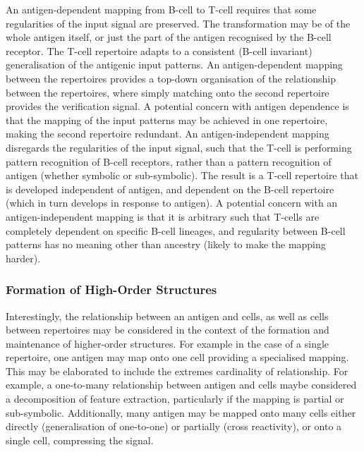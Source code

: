 An antigen-dependent mapping from B-cell to T-cell requires that some regularities of the input signal are preserved. The transformation may be of the whole antigen itself, or just the part of the antigen recognised by the B-cell receptor. The T-cell repertoire adapts to a consistent (B-cell invariant) generalisation of the antigenic input patterns. An antigen-dependent mapping between the repertoires provides a top-down organisation of the relationship between the repertoires, where simply matching onto the second repertoire provides the verification signal.
A potential concern with antigen dependence is that the mapping of the input patterns may be achieved in one repertoire, making the second repertoire redundant. An antigen-independent mapping disregards the regularities of the input signal, such that the T-cell is performing pattern recognition of B-cell receptors, rather than a pattern recognition of antigen (whether symbolic or sub-symbolic). The result is a T-cell repertoire that is developed independent of antigen, and dependent on the B-cell repertoire (which in turn develops in response to antigen). A potential concern with an antigen-independent mapping is that it is arbitrary such that T-cells are completely dependent on specific B-cell lineages, and regularity between B-cell patterns has no meaning other than ancestry (likely to make the mapping harder). 

%
%
\subsubsection{Formation of High-Order Structures}
Interestingly, the relationship between an antigen and cells, as well as cells between repertoires may be considered in the context of the formation and maintenance of higher-order structures.
For example in the case of a single repertoire, one antigen may map onto one cell providing a specialised mapping. This may be elaborated to include the extremes cardinality of relationship. For example, a one-to-many relationship between antigen and cells maybe considered a decomposition of feature extraction, particularly if the mapping is partial or sub-symbolic. Additionally, many antigen may be mapped onto many cells either directly (generalisation of one-to-one) or partially (cross reactivity), or onto a single cell, compressing the signal.

